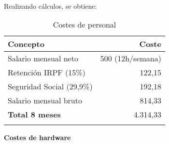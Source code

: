 Realizando cálculos, se obtiene:
\begin{longtable}[]{@{}lr@{}}
	\toprule
	\begin{minipage}[b]{0.38\columnwidth}\raggedright\strut
		\textbf{Concepto}\strut
	\end{minipage} & \begin{minipage}[b]{0.40\columnwidth}\raggedright\strut
		\textbf{Coste}\strut
	\end{minipage}\tabularnewline
	\midrule
	\endhead
	\begin{minipage}[t]{0.38\columnwidth}\raggedright\strut
		Salario mensual neto\strut
	\end{minipage} & \begin{minipage}[t]{0.40\columnwidth}\raggedright\strut
		500 \officialeuro (12h/semana)\strut
	\end{minipage}\tabularnewline
	\begin{minipage}[t]{0.38\columnwidth}\raggedright\strut
		Retención IRPF (15\%)\strut
	\end{minipage} & \begin{minipage}[t]{0.40\columnwidth}\raggedright\strut
		122,15 \officialeuro\strut
	\end{minipage}\tabularnewline
	\begin{minipage}[t]{0.38\columnwidth}\raggedright\strut
		Seguridad Social (29,9\%)\strut
	\end{minipage} & \begin{minipage}[t]{0.40\columnwidth}\raggedright\strut
		192,18 \officialeuro\strut
	\end{minipage}\tabularnewline
	\begin{minipage}[t]{0.38\columnwidth}\raggedright\strut
		Salario mensual bruto\strut
	\end{minipage} & \begin{minipage}[t]{0.40\columnwidth}\raggedright\strut
		814,33 \officialeuro\strut
	\end{minipage}\tabularnewline
	\midrule
	\begin{minipage}[t]{0.38\columnwidth}\raggedright\strut
		\textbf{Total 8 meses}\strut
	\end{minipage} & \begin{minipage}[t]{0.40\columnwidth}\raggedright\strut
		4.314,33 \officialeuro\strut
	\end{minipage}\tabularnewline
	\bottomrule
	\caption{Costes de personal}
\end{longtable}

\textbf{Costes de hardware}


